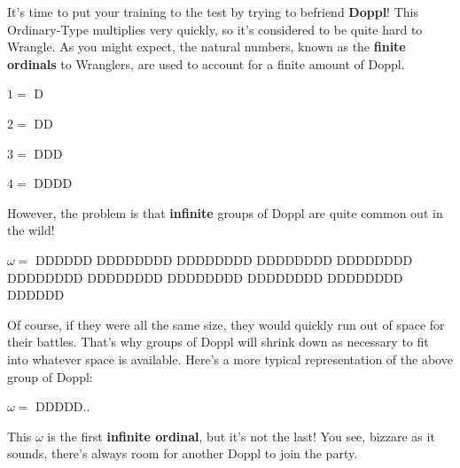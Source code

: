 

\newcommand{\mappDoppl}{D}
\newcommand{\mappDopplOmega}{D{\small{}D}{\footnotesize{}D}{\scriptsize{}D}{\tiny{}D}..}

It's time to put your training to the test by trying to befriend \textbf{Doppl}!
This Ordinary-Type \mappMobimon{} multiplies very quickly, so it's
considered to be quite hard to Wrangle. As you might expect, the natural
numbers, known as the \textbf{finite ordinals} to \mappMobimon{} Wranglers,
are used to account for a finite amount of Doppl.

\(1=\) \mappDoppl

\(2=\) \mappDoppl\mappDoppl

\(3=\) \mappDoppl\mappDoppl\mappDoppl

\(4=\) \mappDoppl\mappDoppl\mappDoppl\mappDoppl

However, the problem is that \textbf{infinite} groups of Doppl are quite
common out in the wild!

\(\omega=\) \mappDoppl\mappDoppl\mappDoppl\mappDoppl\mappDoppl\mappDoppl
\mappDoppl\mappDoppl\mappDoppl\mappDoppl\mappDoppl\mappDoppl\mappDoppl\mappDoppl
\mappDoppl\mappDoppl\mappDoppl\mappDoppl\mappDoppl\mappDoppl\mappDoppl\mappDoppl
\mappDoppl\mappDoppl\mappDoppl\mappDoppl\mappDoppl\mappDoppl\mappDoppl\mappDoppl
\mappDoppl\mappDoppl\mappDoppl\mappDoppl\mappDoppl\mappDoppl\mappDoppl\mappDoppl
\mappDoppl\mappDoppl\mappDoppl\mappDoppl\mappDoppl\mappDoppl\mappDoppl\mappDoppl
\mappDoppl\mappDoppl\mappDoppl\mappDoppl\mappDoppl\mappDoppl\mappDoppl\mappDoppl
\mappDoppl\mappDoppl\mappDoppl\mappDoppl\mappDoppl\mappDoppl\mappDoppl\mappDoppl
\mappDoppl\mappDoppl\mappDoppl\mappDoppl\mappDoppl\mappDoppl\mappDoppl\mappDoppl
\mappDoppl\mappDoppl\mappDoppl\mappDoppl\mappDoppl\mappDoppl\mappDoppl\mappDoppl
\mappDoppl\mappDoppl\mappDoppl\mappDoppl\mappDoppl\mappDoppl

Of course, if they were all the same size, they would quickly run out
of space for their \mappMobimon{} battles. That's
why groups of Doppl will shrink down as necessary to fit into whatever space
is available. Here's a more typical representation of the above group of
Doppl:

\(\omega=\) \mappDopplOmega

This \(\omega\) is the first \textbf{infinite ordinal}, but it's not the last!
You see, bizzare as it sounds, there's always room for another
Doppl to join the party.

